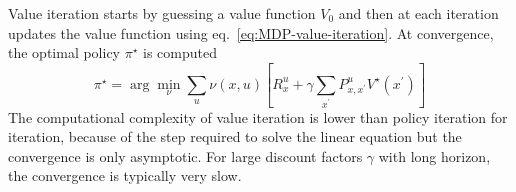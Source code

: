 Value iteration starts by guessing a value function $V_0$ and then at each iteration updates the value function using eq.~\eqref{eq:MDP-value-iteration}. At convergence, the optimal policy $\pi^\star$ is computed
\begin{equation*}
  \pi^\star = \arg \min_\nu \sum_u \nu(x,u)\left[R^u_x + \gamma \sum_{x^\prime}P^u_{x,x^\prime} V^\star(x^\prime)\right]
\end{equation*}
The computational complexity of value iteration is lower than policy iteration for iteration, because of the step required to solve the linear equation but the convergence is only asymptotic. For large discount factors $\gamma$ with long horizon, the convergence is typically very slow.


